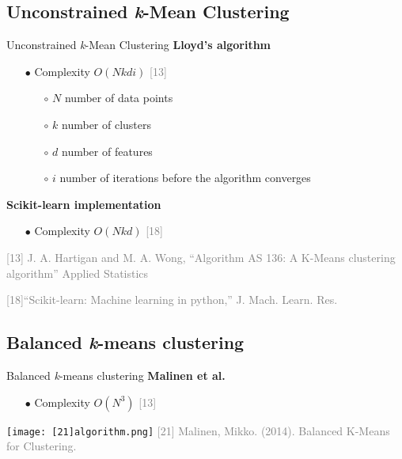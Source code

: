 \subsection{Unconstrained \textit{k}-Mean Clustering}
	\begin{frame}{Unconstrained \textit{k}-Mean Clustering}
		\textbf{Lloyd’s algorithm}
		\begin{itemize}
			\item[$\bullet$] Complexity $O(Nkdi)$ \textcolor{gray}{[13]}
			\begin{itemize}
				\item[$\circ$] $N$ number of data points
				\item[$\circ$] $k$ number of clusters 
				\item[$\circ$] $d$ number of features
				\item[$\circ$] $i$ number of iterations before the algorithm converges
			\end{itemize} 
		\end{itemize}
		\textbf{Scikit-learn implementation}
		\begin{itemize}
			\item[$\bullet$] Complexity $O(Nkd)$ \textcolor{gray}{[18]}
		\end{itemize}
		\bigbreak
		\tiny{ %
			\textcolor{gray}{
				\begin{minipage}{0.5\textwidth} %
					[13] J. A. Hartigan and M. A. Wong, “Algorithm AS 136: A K-Means clustering algorithm” Applied Statistics
				\end{minipage}\hfill
				\begin{minipage}{0.5\textwidth} 
					[18]“Scikit-learn: Machine learning in python,” J. Mach. Learn. Res.
				\end{minipage}\hfill
			}
		}
	\end{frame}



\subsection{Balanced \textit{k}-means clustering}
	\begin{frame}{Balanced \textit{k}-means clustering}
		\textbf{Malinen et al.}
		\begin{itemize}
			\item[$\bullet$] Complexity $O(N^3)$ \textcolor{gray}{[13]}
		\end{itemize}
		\texttt{[image: [21]algorithm.png]}
		\break
		\tiny{ %
			\textcolor{gray}{
				[21] Malinen, Mikko. (2014). Balanced K-Means for Clustering. 
			}
		}
	\end{frame}

